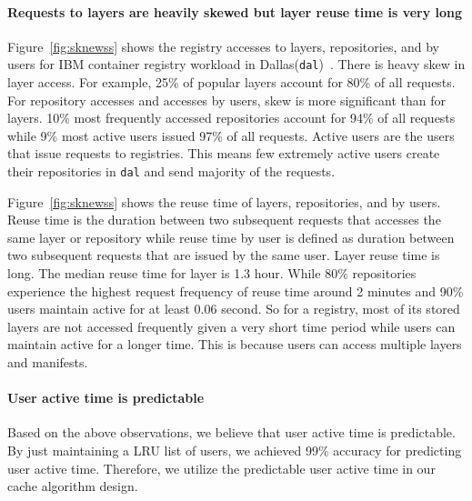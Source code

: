 \paragraph{Requests to layers are heavily skewed but layer reuse time is very long}
Figure~\ref{fig:sknewss} shows the registry accesses to layers, repositories, and by users for IBM container registry workload in Dallas(\texttt{dal})~\cite{dockerworkload}. There is heavy skew in layer access. For example, 25\% of popular layers account for 80\% of all requests. For repository accesses and accesses by users, skew is more significant than for layers. 10\% most frequently accessed repositories account for 94\% of all requests while 9\% most active users issued 97\% of all requests. Active users are the users that issue requests to registries.
This means few extremely active users create their repositories in \texttt{dal} and send majority of the requests.

Figure~\ref{fig:sknewss} shows the reuse time of layers, repositories, and by users. Reuse time is the duration between two subsequent requests that accesses the same layer or repository while reuse time by user is defined as duration between two subsequent requests that are issued by the same user. 
Layer reuse time is long.
The median reuse time for layer is 1.3 hour. While 80\% repositories experience the highest request frequency of reuse time around 2 minutes and 90\% users maintain active for at least 0.06 second.
So for a registry, most of its stored layers are not accessed frequently given a very short time period while
users can maintain active for a longer time. 
This is because users can access multiple layers and manifests.

\paragraph{User active time is predictable} 
Based on the above observations, we believe that user active time is predictable. 
By just maintaining a LRU list of users, we achieved 99\% accuracy for predicting user active time.
Therefore, we utilize the predictable user active time in our cache algorithm design.


